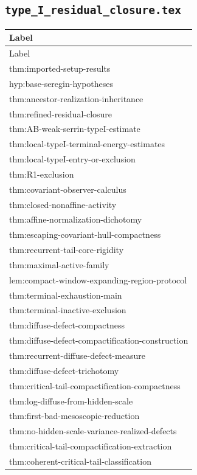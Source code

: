\documentclass[11pt]{amsart}
\begin{document}
\subsection{\texorpdfstring{\texttt{type\_I\_residual\_closure.tex}}{typeI residual branch.tex}}

\begin{longtable}{@{}>{\ttfamily\footnotesize\raggedright\arraybackslash}p{}@{}}
\toprule
Label\\
\midrule
\endfirsthead
\toprule
Label\\
\midrule
\endhead
thm:imported-setup-results\\
hyp:base-seregin-hypotheses\\
thm:ancestor-realization-inheritance\\
thm:refined-residual-closure\\
thm:AB-weak-serrin-typeI-estimate\\
thm:local-typeI-terminal-energy-estimates\\
thm:local-typeI-entry-or-exclusion\\
thm:R1-exclusion\\
thm:covariant-observer-calculus\\
thm:closed-nonaffine-activity\\
thm:affine-normalization-dichotomy\\
thm:escaping-covariant-hull-compactness\\
thm:recurrent-tail-core-rigidity\\
thm:maximal-active-family\\
lem:compact-window-expanding-region-protocol\\
thm:terminal-exhaustion-main\\
thm:terminal-inactive-exclusion\\
thm:diffuse-defect-compactness\\
thm:diffuse-defect-compactification-construction\\
thm:recurrent-diffuse-defect-measure\\
thm:diffuse-defect-trichotomy\\
thm:critical-tail-compactification-compactness\\
thm:log-diffuse-from-hidden-scale\\
thm:first-bad-mesoscopic-reduction\\
thm:no-hidden-scale-variance-realized-defects\\
thm:critical-tail-compactification-extraction\\
thm:coherent-critical-tail-classification\\

\end{longtable}
\end{document}
